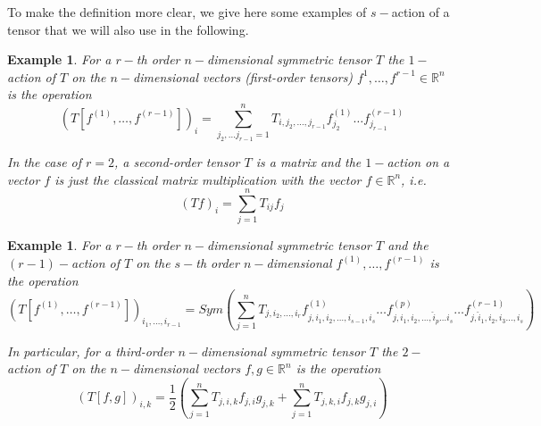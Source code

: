\documentclass[11pt]{article}
\newtheorem{example}[theorem]{Example}
\def\R{\mathbb{R}}
\begin{document}
To make the definition more clear, we give here some examples of $s-$action of a tensor that we will also use in the following.

\begin{example}
For a $r-$th order $n-$dimensional symmetric tensor $T$ the $1-$action of $T$ on the $n-$dimensional vectors  (first-order tensors) $f^1,\ldots, f^{r-1}\in \R^n$  is the operation
\begin{equation*}
(T[f^{(1)},\ldots,f^{(r-1)}])_{i}=\sum^n_{j_2,\ldots j_{r-1}=1}T_{i,j_2,\ldots,j_{r-1}}f^{(1)}_{j_2}\ldots f^{(r-1)}_{j_{r-1}}
\end{equation*}

In the case of $r=2$, a second-order tensor $T$ is a matrix and the $1-$action on a vector $f$ is just  the classical matrix multiplication with the vector $f\in \R^n$, i.e.
\begin{equation*}
(Tf)_{i}=\sum^n_{j=1}T_{ij}f_{j}
\end{equation*}

\end{example}
\begin{example}
For a $r-$th order $n-$dimensional symmetric tensor $T$ and the $(r-1)-$action of $T$ on the $s-$th order $n-$dimensional $f^{(1)},\ldots, f^{(r-1)}$ is the operation 
\begin{equation*}
(T[f^{(1)},\ldots,f^{(r-1)}])_{i_1,\ldots,i_{r-1}}=Sym(\sum^n_{j=1}T_{j,i_2,\ldots,i_{r}}f^{(1)}_{j,i_1,i_2,\ldots,i_{s-1},\hat{i}_s}\ldots f^{(p)}_{j,i_1,i_2,\ldots,  \hat{i}_p\ldots i_{s}} \ldots f^{(r-1)}_{j,\hat{i}_1,i_2,i_3\ldots,i_{s}})
\end{equation*}

In particular, for a third-order $n-$dimensional symmetric tensor $T$ the $2-$action of $T$ on the $n-$dimensional vectors  $f,g\in \R^n$  is the operation
\begin{equation*}
(T[f,g])_{i,k}=\frac{1}{2}(\sum^n_{j=1}T_{j,i,k}f_{j,i}g_{j,k}+\sum^n_{j=1}T_{j,k,i}f_{j,k}g_{j,i} )
\end{equation*}
\end{example}
\end{document}
